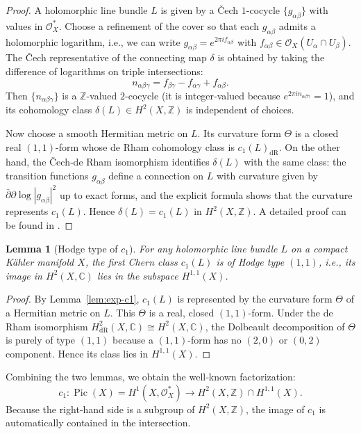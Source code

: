 \documentclass[12pt]{article}
\theoremstyle{plain}
\newtheorem{lemma}[theorem]{Lemma}
\theoremstyle{definition}
\begin{document}
\begin{proof}
A holomorphic line bundle $L$ is given by a Čech $1$-cocycle $\{g_{\alpha\beta}\}$ with values in $\mathcal O_X^*$.
Choose a refinement of the cover so that each $g_{\alpha\beta}$ admits a holomorphic logarithm, i.e., we can write $g_{\alpha\beta} = e^{2\pi i f_{\alpha\beta}}$ with $f_{\alpha\beta} \in \mathcal O_X(U_\alpha\cap U_\beta)$.
The Čech representative of the connecting map $\delta$ is obtained by taking the difference of logarithms on triple intersections:
\[
n_{\alpha\beta\gamma} = f_{\beta\gamma} - f_{\alpha\gamma} + f_{\alpha\beta}.
\]
Then $\{n_{\alpha\beta\gamma}\}$ is a $\mathbb Z$-valued $2$-cocycle (it is integer‑valued because $e^{2\pi i n_{\alpha\beta\gamma}} = 1$), and its cohomology class $\delta(L) \in H^2(X,\mathbb Z)$ is independent of choices.

Now choose a smooth Hermitian metric on $L$. Its curvature form $\Theta$ is a closed real $(1,1)$-form whose de Rham cohomology class is $c_1(L)_{\mathrm{dR}}$. On the other hand, the Čech‑de Rham isomorphism identifies $\delta(L)$ with the same class: the transition functions $g_{\alpha\beta}$ define a connection on $L$ with curvature given by $\bar\partial \partial \log |g_{\alpha\beta}|^2$ up to exact forms, and the explicit formula shows that the curvature represents $c_1(L)$. Hence $\delta(L) = c_1(L)$ in $H^2(X,\mathbb Z)$. A detailed proof can be found in \cite{griffiths-harris}.
\end{proof}

\begin{lemma}[Hodge type of $c_1$]\label{lem:c1-type}
For any holomorphic line bundle $L$ on a compact K\"ahler manifold $X$, the first Chern class $c_1(L)$ is of Hodge type $(1,1)$, i.e., its image in $H^2(X,\mathbb C)$ lies in the subspace $H^{1,1}(X)$.
\end{lemma}

\begin{proof}
By Lemma~\ref{lem:exp-c1}, $c_1(L)$ is represented by the curvature form $\Theta$ of a Hermitian metric on $L$. This $\Theta$ is a real, closed $(1,1)$-form. Under the de Rham isomorphism $H^2_{\mathrm{dR}}(X,\mathbb C) \cong H^2(X,\mathbb C)$, the Dolbeault decomposition of $\Theta$ is purely of type $(1,1)$ because a $(1,1)$-form has no $(2,0)$ or $(0,2)$ component. Hence its class lies in $H^{1,1}(X)$.
\end{proof}

Combining the two lemmas, we obtain the well‑known factorization:
\[
c_1: \operatorname{Pic}(X) = H^1(X,\mathcal O_X^*) \longrightarrow H^2(X,\mathbb Z) \cap H^{1,1}(X).
\]
Because the right‑hand side is a subgroup of $H^2(X,\mathbb Z)$, the image of $c_1$ is automatically contained in the intersection.
\end{document}
